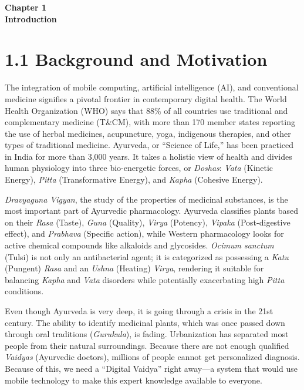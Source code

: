 \documentclass[12pt]{article}
\begin{document}
\vspace*{\fill}
\begin{center}
\textbf{\Huge{Chapter 1}}\\
\vspace{5mm}
\textbf{\Huge{Introduction}}
\end{center}
\vspace*{\fill}
\newpage

\section*{1.1 \quad Background and Motivation}
\justify

The integration of mobile computing, artificial intelligence (AI), and conventional medicine
signifies a pivotal frontier in contemporary digital health. The World Health Organization (WHO)
says that 88\% of all countries use traditional and complementary medicine (T\&CM), with more than
170 member states reporting the use of herbal medicines, acupuncture, yoga, indigenous therapies,
and other types of traditional medicine. Ayurveda, or ``Science of Life,'' has been practiced in
India for more than 3,000 years. It takes a holistic view of health and divides human physiology
into three bio-energetic forces, or \textit{Doshas}: \textit{Vata} (Kinetic Energy),
\textit{Pitta} (Transformative Energy), and \textit{Kapha} (Cohesive Energy).

\textit{Dravyaguna Vigyan}, the study of the properties of medicinal substances, is the most
important part of Ayurvedic pharmacology. Ayurveda classifies plants based on their \textit{Rasa}
(Taste), \textit{Guna} (Quality), \textit{Virya} (Potency), \textit{Vipaka} (Post-digestive
effect), and \textit{Prabhava} (Specific action), while Western pharmacology looks for active
chemical compounds like alkaloids and glycosides. \textit{Ocimum sanctum} (Tulsi) is not only an
antibacterial agent; it is categorized as possessing a \textit{Katu} (Pungent) \textit{Rasa} and
an \textit{Ushna} (Heating) \textit{Virya}, rendering it suitable for balancing \textit{Kapha} and
\textit{Vata} disorders while potentially exacerbating high \textit{Pitta} conditions.

Even though Ayurveda is very deep, it is going through a crisis in the 21st century. The ability
to identify medicinal plants, which was once passed down through oral traditions
(\textit{Gurukula}), is fading. Urbanization has separated most people from their natural
surroundings. Because there are not enough qualified \textit{Vaidyas} (Ayurvedic doctors), millions
of people cannot get personalized diagnosis. Because of this, we need a ``Digital Vaidya'' right
away---a system that would use mobile technology to make this expert knowledge available to everyone.
\end{document}
